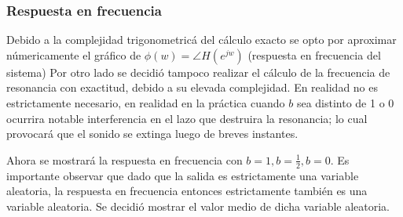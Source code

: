 \documentclass[assd_tp2_main.tex]{subfiles}
\begin{document}
\subsubsection{Respuesta en frecuencia}

Debido a la complejidad trigonometricá del cálculo exacto se opto por aproximar númericamente el gráfico de $\phi(w)=\angle H(e^{jw})$ (respuesta en frecuencia del sistema) 
Por otro lado se decidió tampoco realizar el cálculo de la frecuencia de resonancia con exactitud, debido a su elevada complejidad. En realidad no es estrictamente necesario, en realidad en la práctica cuando $b$ sea distinto de 1 o 0 ocurrira notable interferencia en el lazo que destruira la resonancia; lo cual provocará que el sonido se extinga luego de breves instantes.

Ahora se mostrará la respuesta en frecuencia con $b=1, b=\frac{1}{2}, b=0$. Es importante observar que dado que la salida es estrictamente una variable aleatoria, la respuesta en frecuencia entonces estrictamente también es una variable aleatoria. Se decidió mostrar el valor medio de dicha variable aleatoria.
\end{document}

